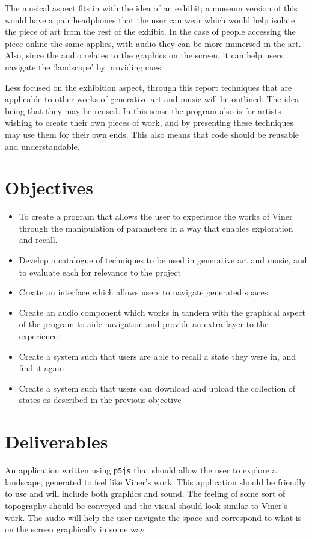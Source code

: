 The musical aspect fits in with the idea of an exhibit; a museum version of this
would have a pair headphones that the user can wear which would help isolate the
piece of art from the rest of the exhibit. In the case of people accessing the
piece online the same applies, with audio they can be more immersed in the art.
Also, since the audio relates to the graphics on the screen, it can help users
navigate the `landscape' by providing cues.

Less focused on the exhibition aspect, through this report techniques that are
applicable to other works of generative art and music will be outlined. The idea
being that they may be reused. In this sense the program also is for artists
wishing to create their own pieces of work, and by presenting these techniques
may use them for their own ends. This also means that code should be reusable
and understandable.

\section{Objectives}
\begin{itemize}
    \item To create a program that allows the user to experience the works of
        Viner through the manipulation of parameters in a way that enables
        exploration and recall.
    \item Develop a catalogue of techniques to be used in generative art and
        music, and to evaluate each for relevance to the project
    \item Create an interface which allows users to navigate generated spaces
    \item Create an audio component which works in tandem with the graphical aspect
        of the program to aide navigation and provide an extra layer to the
        experience
    \item Create a system such that users are able to recall a state they were
        in, and find it again
    \item Create a system such that users can download and upload the collection
        of states as described in the previous objective
\end{itemize}

\section{Deliverables}
An application written using \verb|p5js| that should allow the user to explore a
landscape, generated to feel like Viner's work. This application should be
friendly to use and will include both graphics and sound. The feeling of some
sort of topography should be conveyed and the visual should look similar to
Viner's work. The audio will help the user navigate the space and correspond to
what is on the screen graphically in some way.

